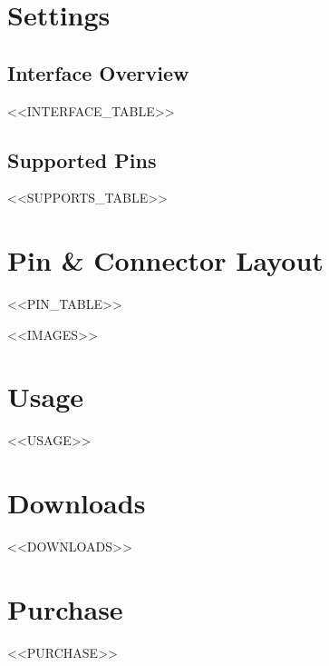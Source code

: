 \documentclass[10pt]{article}
\begin{document}
\vspace{1em}



\section*{Settings}

\subsection*{Interface Overview}
<<INTERFACE_TABLE>>

\subsection*{Supported Pins}
<<SUPPORTS_TABLE>>





\section*{Pin \& Connector Layout}
<<PIN_TABLE>>

\FloatBarrier
<<IMAGES>>


\section*{Usage}
<<USAGE>>

\section*{Downloads}

<<DOWNLOADS>>

\section*{Purchase}
<<PURCHASE>>
\end{document}

